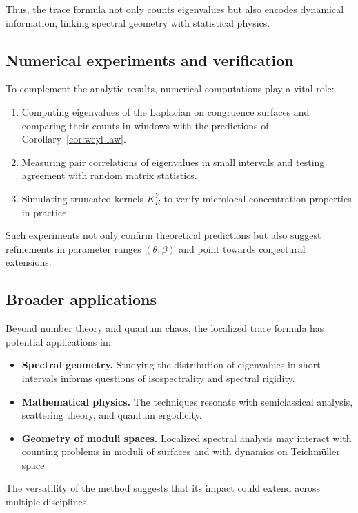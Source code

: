 Thus, the trace formula not only counts eigenvalues but also encodes dynamical information, linking spectral geometry with statistical physics.

\subsection{Numerical experiments and verification}\label{subsec:numerics}

To complement the analytic results, numerical computations play a vital role:

\begin{enumerate}
\item Computing eigenvalues of the Laplacian on congruence surfaces and comparing their counts in windows with the predictions of Corollary~\ref{cor:weyl-law}.
\item Measuring pair correlations of eigenvalues in small intervals and testing agreement with random matrix statistics.
\item Simulating truncated kernels $K_R^Y$ to verify microlocal concentration properties in practice.
\end{enumerate}

Such experiments not only confirm theoretical predictions but also suggest refinements in parameter ranges $(\theta,\beta)$ and point towards conjectural extensions.

\subsection{Broader applications}\label{subsec:broader}

Beyond number theory and quantum chaos, the localized trace formula has potential applications in:

\begin{itemize}
\item \textbf{Spectral geometry.} Studying the distribution of eigenvalues in short intervals informs questions of isospectrality and spectral rigidity.
\item \textbf{Mathematical physics.} The techniques resonate with semiclassical analysis, scattering theory, and quantum ergodicity.
\item \textbf{Geometry of moduli spaces.} Localized spectral analysis may interact with counting problems in moduli of surfaces and with dynamics on Teichmüller space.
\end{itemize}

The versatility of the method suggests that its impact could extend across multiple disciplines.

